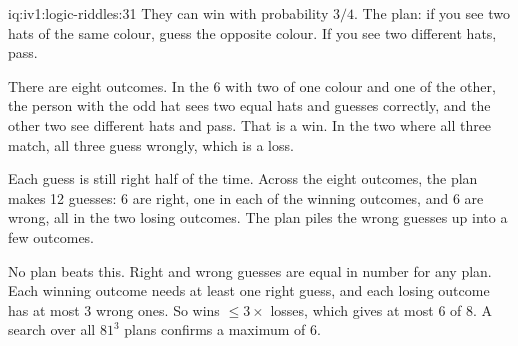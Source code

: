 \begin{solution}{iq:iv1:logic-riddles:31}
They can win with probability $3/4$. The plan: if you see two hats of the same colour, guess the opposite colour. If you see two different hats, pass.

There are eight outcomes. In the 6 with two of one colour and one of the other, the person with the odd hat sees two equal hats and guesses correctly, and the other two see different hats and pass. That is a win. In the two where all three match, all three guess wrongly, which is a loss.

Each guess is still right half of the time. Across the eight outcomes, the plan makes 12 guesses: 6 are right, one in each of the winning outcomes, and 6 are wrong, all in the two losing outcomes. The plan piles the wrong guesses up into a few outcomes.

No plan beats this. Right and wrong guesses are equal in number for any plan. Each winning outcome needs at least one right guess, and each losing outcome has at most 3 wrong ones. So wins $\le 3 \times$ losses, which gives at most $6$ of 8. A search over all $81^3$ plans confirms a maximum of 6.

\end{solution}

